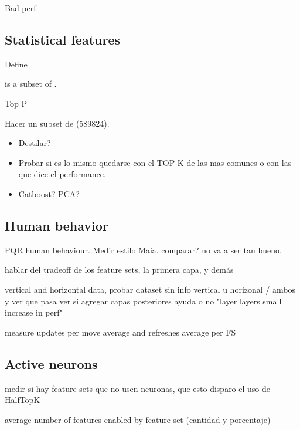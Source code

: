 
Bad perf.

\subsection{Statistical features}

Define 

 is a subset of .

Top P

Hacer un subset de  (589824).

\begin{itemize}
\item Destilar?
\item Probar si es lo mismo quedarse con el TOP K de las mas comunes o con las que dice el performance.
\item Catboost? PCA?
\end{itemize}

\subsection{Human behavior}

PQR human behaviour. Medir estilo Maia. comparar? no va a ser tan bueno.




hablar del tradeoff de los feature sets, la primera capa, y demás

vertical and horizontal data, probar dataset sin info vertical u horizonal / ambos y ver que pasa
ver si agregar capas posteriores ayuda o no "layer layers small increase in perf"

measure updates per move average and refreshes average per FS



\subsection{Active neurons}

medir si hay feature sets que no usen neuronas, que esto disparo el uso de HalfTopK

average number of features enabled by feature set (cantidad y porcentaje)



